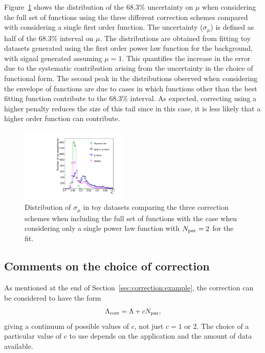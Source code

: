 Figure~\ref{fig:correction:compareerrors} shows the distribution of the 68.3\%
 uncertainty on $\mu$
when considering the full set of functions using the three different correction schemes compared
with considering a single first order function. The uncertainty ($\sigma_{\mu}$)
is defined as half of the 68.3\% interval on $\mu$.
The distributions are obtained from fitting
toy datasets generated using the first order power law function for the background, with
signal generated assuming $\mu=1$. This quantifies the increase in the error
due to the systematic contribution arising from the uncertainty in the choice of functional form.
The second peak in the distributions observed
when considering the envelope of functions are due to cases in which functions other than the
best fitting function contribute to the 68.3\% interval. As expected, correcting using a higher
penalty reduces the size of this tail since in this case, it is less likely that a higher order
function can contribute.

\begin{figure}[tbp]
\centering
\includegraphics[width=0.45\textwidth]{correction/compare_error_magnitude.pdf}
\caption{Distribution of $\sigma_{\mu}$ in toy datasets
comparing the three correction schemes
when including the full set of functions
with the case when considering only a single power law function
with $N_{\rm par}=2$ for the fit.}
\label{fig:correction:compareerrors}
\end{figure}

\subsection{Comments on the choice of correction}
\label{sec:correction:comments}
 As mentioned at the end of Section~\ref{sec:correction:example},
the correction can be considered to have the form
\begin{displaymath}
\Lambda_{\mathrm{corr}} = \textrm{\ensuremath{\Lambda}} + cN_{\rm par},
\end{displaymath}
giving a continuum of possible values of $c$, not just $c=1$ or 2.
The choice of a particular value of $c$ to use depends on the application
and the amount of data available.

